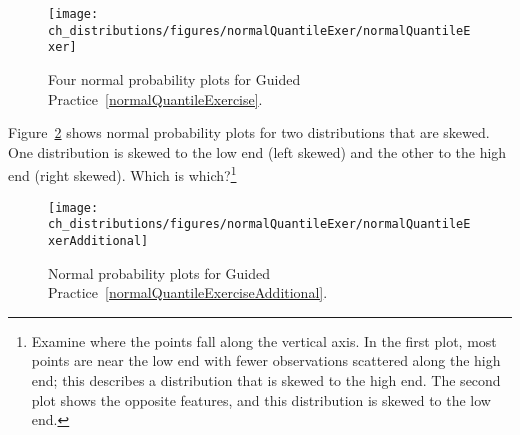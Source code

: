 \begin{figure}
\centering
\texttt{[image: ch\_distributions/figures/normalQuantileExer/normalQuantileExer]}
\caption{Four normal probability plots for Guided Practice~\ref{normalQuantileExercise}.}
\label{normalQuantileExer}
\end{figure}


\begin{exercise} \label{normalQuantileExerciseAdditional}
Figure~\ref{normalQuantileExerAdditional} shows normal probability plots for two distributions that are skewed. One distribution is skewed to the low end (left skewed) and the other to the high end (right skewed). Which is which?\footnote{Examine where the points fall along the vertical axis. In the first plot, most points are near the low end with fewer observations scattered along the high end; this describes a distribution that is skewed to the high end. The second plot shows the opposite features, and this distribution is skewed to the low end.}
\end{exercise}

\begin{figure}
\centering
\texttt{[image: ch\_distributions/figures/normalQuantileExer/normalQuantileExerAdditional]}
\caption{Normal probability plots for Guided Practice~\ref{normalQuantileExerciseAdditional}.}
\label{normalQuantileExerAdditional}
\end{figure}




